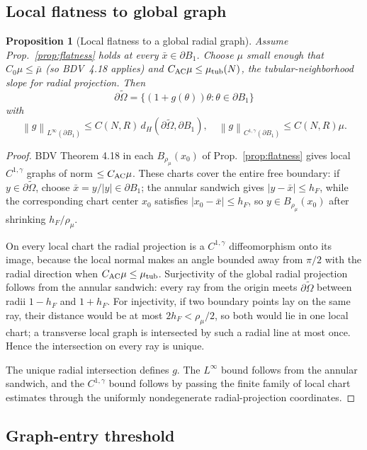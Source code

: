 \documentclass[11pt]{article}
\newtheorem{proposition}[theorem]{Proposition}
\theoremstyle{definition}
\newcommand{\norm}[1]{\left\|#1\right\|}
\newcommand{\abs}[1]{\left|#1\right|}
\begin{document}
\subsection{Local flatness to global graph}

\begin{proposition}[Local flatness to a global radial graph]\label{prop:globalgraph}
Assume Prop.~\ref{prop:flatness} holds at every $\bar x\in\partial B_1$.
Choose $\mu$ small enough that $C_0\mu\le\bar\mu$ (so BDV~4.18 applies) and
$C_{\rm AC}\mu\le\mu_{\rm tub}(N)$, the tubular-neighborhood slope for radial
projection. Then
\[
\partial\widetilde\Omega=\{(1+g(\theta))\theta:\theta\in\partial B_1\}
\]
with
\[
\norm{g}_{L^\infty(\partial B_1)}\le C(N,R)\,d_H(\partial\widetilde\Omega,\partial B_1),
\quad
\norm{g}_{C^{1,\gamma}(\partial B_1)}\le C(N,R)\mu.
\]
\end{proposition}

\begin{proof}
BDV Theorem 4.18 in each $B_{\rho_\mu}(x_0)$ of Prop.~\ref{prop:flatness}
gives local $C^{1,\gamma}$ graphs of norm $\le C_{\rm AC}\mu$. These charts
cover the entire free boundary: if $y\in\partial\widetilde\Omega$, choose
$\bar x=y/\abs y\in\partial B_1$; the annular sandwich gives
$\abs{y-\bar x}\le h_F$, while the corresponding chart center $x_0$ satisfies
$\abs{x_0-\bar x}\le h_F$, so $y\in B_{\rho_\mu}(x_0)$ after shrinking
$h_F/\rho_\mu$.

On every local chart the radial projection is a $C^{1,\gamma}$ diffeomorphism
onto its image, because the local normal makes an angle bounded away from
$\pi/2$ with the radial direction when $C_{\rm AC}\mu\le\mu_{\rm tub}$.
Surjectivity of the global radial projection follows from the annular
sandwich: every ray from the origin meets $\partial\widetilde\Omega$ between
radii $1-h_F$ and $1+h_F$. For injectivity, if two boundary points lay on the
same ray, their distance would be at most $2h_F<\rho_\mu/2$, so both would lie
in one local chart; a transverse local graph is intersected by such a radial
line at most once. Hence the intersection on every ray is unique.

The unique radial intersection defines $g$. The $L^\infty$ bound follows from
the annular sandwich, and the $C^{1,\gamma}$ bound follows by passing the
finite family of local chart estimates through the uniformly nondegenerate
radial-projection coordinates.
\end{proof}

\subsection{Graph-entry threshold}
\end{document}

